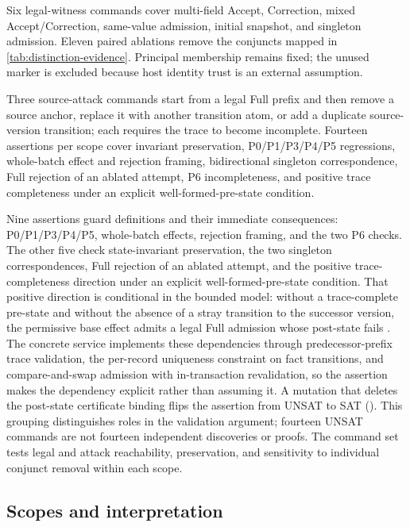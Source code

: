 Six legal-witness commands cover multi-field Accept, Correction, mixed Accept/Correction, same-value admission, initial snapshot, and singleton admission. Eleven paired ablations remove the conjuncts mapped in \cref{tab:distinction-evidence}. Principal membership remains fixed; the unused  marker is excluded because host identity trust is an external assumption.

Three source-attack commands start from a legal Full prefix and then remove a source anchor, replace it with another transition atom, or add a duplicate source-version transition; each requires the trace to become incomplete. Fourteen assertions per scope cover invariant preservation, P0/P1/P3/P4/P5 regressions, whole-batch effect and rejection framing, bidirectional singleton correspondence, Full rejection of an ablated attempt, P6 incompleteness, and positive trace completeness under an explicit well-formed-pre-state condition.

Nine assertions guard definitions and their immediate consequences: P0/P1/P3/P4/P5, whole-batch effects, rejection framing, and the two P6 checks. The other five check state-invariant preservation, the two singleton correspondences, Full rejection of an ablated attempt, and the positive trace-completeness direction under an explicit well-formed-pre-state condition. That positive direction is conditional in the bounded model: without a trace-complete pre-state and without the absence of a stray transition to the successor version, the permissive base effect admits a legal Full admission whose post-state fails . The concrete service implements these dependencies through predecessor-prefix trace validation, the per-record uniqueness constraint on fact transitions, and compare-and-swap admission with in-transaction revalidation, so the assertion makes the dependency explicit rather than assuming it. A mutation that deletes the post-state certificate binding flips the assertion from UNSAT to SAT (). This grouping distinguishes roles in the validation argument; fourteen UNSAT commands are not fourteen independent discoveries or proofs. The command set tests legal and attack reachability, preservation, and sensitivity to individual conjunct removal within each scope.

\subsection{Scopes and interpretation}

